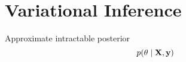 \section{Variational Inference}

\begin{definition}[Idea]
    Approximate intractable posterior \[p(\theta \mid \vb{X}, \vb{y})\]
\end{definition}
